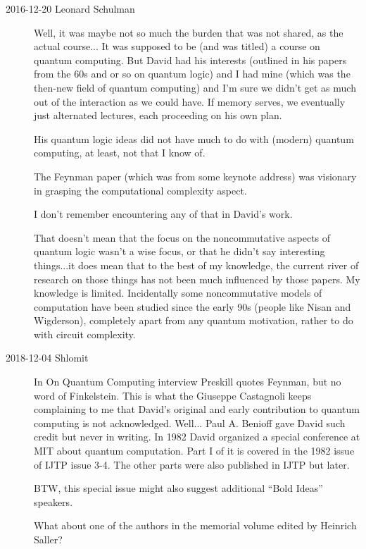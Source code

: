 \begin{description}
\item[2016-12-20 Leonard Schulman]
Well, it was maybe not so much the burden that was not shared,
as the actual course... It was supposed to be (and was titled) a course
on quantum computing. But David had his interests (outlined in his
papers from the 60s and or so on quantum logic) and I had mine (which
was the then-new field of quantum computing) and I'm sure we didn't get
as much out of the interaction as we could have. If memory serves, we
eventually just alternated lectures, each proceeding on his own plan.

His quantum logic ideas did not have much to do with (modern) quantum computing,
at least, not that I know of.

The Feynman paper (which was from some keynote address) was
visionary in grasping the computational complexity aspect.

I don't remember encountering any of that in David's work.

That doesn't mean that the focus on the noncommutative aspects of quantum logic
wasn't a wise focus, or that he didn't say interesting things...it does mean that
to the best of my knowledge, the current river of research on those things has
not been much influenced by those papers. My knowledge is limited. Incidentally
some noncommutative models of computation have been studied since the early 90s
(people like Nisan and Wigderson), completely apart from any quantum motivation,
rather to do with circuit complexity.

\item[2018-12-04 Shlomit]
In 
   {On Quantum Computing} interview
Preskill quotes Feynman, but no word of Finkelstein. This is what the Giuseppe
Castagnoli keeps complaining to me
that David's original and early contribution to quantum computing is not
acknowledged. Well... Paul A. Benioff gave David such
credit but never in writing.
In 1982 David organized a special conference at MIT about quantum computation.
Part I of it is covered in the 1982 issue of IJTP
 {issue 3-4}. The other parts
were also published in IJTP but later.

BTW, this special issue might also suggest additional ``Bold Ideas'' speakers.

What about one of the authors in the
 {memorial volume} edited by
Heinrich Saller?


\end{description}
